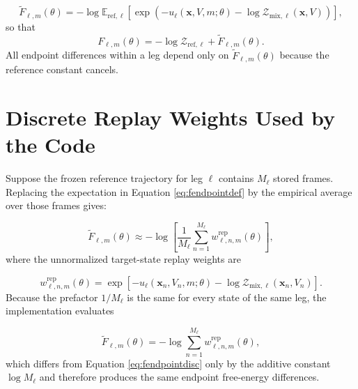 \begin{equation}
    \widetilde{F}_{\ell,m}(\theta)
    =
    -
    \log
    \mathbb{E}_{\mathrm{ref},\ell}
    \left[
        \exp \left(
            -u_\ell(\mathbf{x}, V, m; \theta)
            -
            \log \mathcal{Z}_{\mathrm{mix},\ell}(\mathbf{x}, V)
        \right)
    \right],
    \label{eq:fendpointdef}
\end{equation}
%
so that
%
\begin{equation}
    F_{\ell,m}(\theta)
    =
    -\log \mathcal{Z}_{\mathrm{ref},\ell}
    +
    \widetilde{F}_{\ell,m}(\theta).
    \label{eq:fendpointconst}
\end{equation}
%
All endpoint differences within a leg depend only on $\widetilde{F}_{\ell,m}(\theta)$ because the reference constant cancels.

\section{Discrete Replay Weights Used by the Code}

Suppose the frozen reference trajectory for leg $\ell$ contains $M_\ell$ stored frames. Replacing the expectation in Equation \eqref{eq:fendpointdef} by the empirical average over those frames gives:

\begin{equation}
    \widetilde{F}_{\ell,m}(\theta)
    \approx
    -
    \log
    \left[
        \frac{1}{M_\ell}
        \sum_{n=1}^{M_\ell}
        w^{\mathrm{rep}}_{\ell,n,m}(\theta)
    \right],
    \label{eq:fendpointdisc}
\end{equation}
%
where the unnormalized target-state replay weights are

\begin{equation}
    w^{\mathrm{rep}}_{\ell,n,m}(\theta)
    =
    \exp \left[
        -u_\ell(\mathbf{x}_n, V_n, m; \theta)
        -
        \log \mathcal{Z}_{\mathrm{mix},\ell}(\mathbf{x}_n, V_n)
    \right].
    \label{eq:am}
\end{equation}
%
Because the prefactor $1/M_\ell$ is the same for every state of the same leg, the implementation evaluates

\begin{equation}
    \widetilde{F}_{\ell,m}(\theta)
    =
    -
    \log
    \sum_{n=1}^{M_\ell}
    w^{\mathrm{rep}}_{\ell,n,m}(\theta),
    \label{eq:fendpointimpl}
\end{equation}
%
which differs from Equation \eqref{eq:fendpointdisc} only by the additive constant $\log M_\ell$ and therefore produces the same endpoint free-energy differences.

